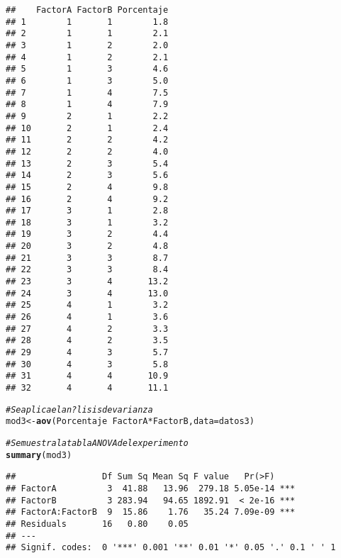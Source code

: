 \documentclass[10pt,a4paper]{article}\usepackage[]{graphicx}\usepackage[]{color}
\makeatletter
\newcommand{\hlcom}[1]{\textcolor[rgb]{0.678,0.584,0.686}{\textit{#1}}}%
\newcommand{\hlopt}[1]{\textcolor[rgb]{0,0,0}{#1}}%
\newcommand{\hlstd}[1]{\textcolor[rgb]{0.345,0.345,0.345}{#1}}%
\newcommand{\hlkwb}[1]{\textcolor[rgb]{0.69,0.353,0.396}{#1}}%
\newcommand{\hlkwc}[1]{\textcolor[rgb]{0.333,0.667,0.333}{#1}}%
\newcommand{\hlkwd}[1]{\textcolor[rgb]{0.737,0.353,0.396}{\textbf{#1}}}%
\newenvironment{kframe}{%
 \def\at@end@of@kframe{}%
 \ifinner\ifhmode%
  \def\at@end@of@kframe{\end{minipage}}%
  \begin{minipage}{\columnwidth}%
 \fi\fi%
 \def\FrameCommand##1{\hskip\@totalleftmargin \hskip-\fboxsep
 \colorbox{shadecolor}{##1}\hskip-\fboxsep
     \hskip-\linewidth \hskip-\@totalleftmargin \hskip\columnwidth}%
 \MakeFramed {\advance\hsize-\width
   \@totalleftmargin\z@ \linewidth\hsize
   \@setminipage}}%
 {\par\unskip\endMakeFramed%
 \at@end@of@kframe}
\newenvironment{knitrout}{}{} %
\makeatother
\begin{document}
\begin{knitrout}
\begin{kframe}
\begin{verbatim}
##    FactorA FactorB Porcentaje
## 1        1       1        1.8
## 2        1       1        2.1
## 3        1       2        2.0
## 4        1       2        2.1
## 5        1       3        4.6
## 6        1       3        5.0
## 7        1       4        7.5
## 8        1       4        7.9
## 9        2       1        2.2
## 10       2       1        2.4
## 11       2       2        4.2
## 12       2       2        4.0
## 13       2       3        5.4
## 14       2       3        5.6
## 15       2       4        9.8
## 16       2       4        9.2
## 17       3       1        2.8
## 18       3       1        3.2
## 19       3       2        4.4
## 20       3       2        4.8
## 21       3       3        8.7
## 22       3       3        8.4
## 23       3       4       13.2
## 24       3       4       13.0
## 25       4       1        3.2
## 26       4       1        3.6
## 27       4       2        3.3
## 28       4       2        3.5
## 29       4       3        5.7
## 30       4       3        5.8
## 31       4       4       10.9
## 32       4       4       11.1
\end{verbatim}
\begin{alltt}
\hlcom{# Se aplica el an?lisis de varianza }
\hlstd{mod3} \hlkwb{<-} \hlkwd{aov}\hlstd{(Porcentaje} \hlopt{~} \hlstd{FactorA} \hlopt{*} \hlstd{FactorB,} \hlkwc{data} \hlstd{= datos3)}

\hlcom{# Se muestra la tabla ANOVA del experimento }
\hlkwd{summary}\hlstd{(mod3)}
\end{alltt}
\begin{verbatim}
##                 Df Sum Sq Mean Sq F value   Pr(>F)    
## FactorA          3  41.88   13.96  279.18 5.05e-14 ***
## FactorB          3 283.94   94.65 1892.91  < 2e-16 ***
## FactorA:FactorB  9  15.86    1.76   35.24 7.09e-09 ***
## Residuals       16   0.80    0.05                     
## ---
## Signif. codes:  0 '***' 0.001 '**' 0.01 '*' 0.05 '.' 0.1 ' ' 1
\end{verbatim}
\end{kframe}
\end{knitrout}
\end{document}
